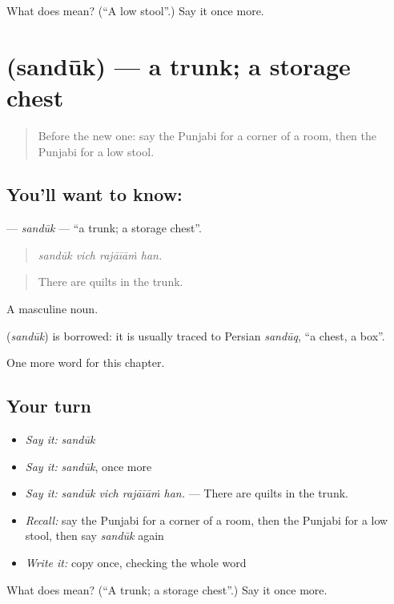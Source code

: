 \begin{tcolorbox}[breakable,colback=teal!4,colframe=teal!35!black,title={Before you move on}]
What does  mean? (\textquotedblleft{}A low stool\textquotedblright{}.) Say it once more.
\end{tcolorbox}
\section[\texorpdfstring{\pa{ਸੰਦੂਕ} (sandūk)}{ਸੰਦੂਕ (sandūk)}]{ (sandūk) — a trunk; a storage chest}

\label{lesson:PA-C247-sanduk}



\begin{quote}
Before the new one: say the Punjabi for a corner of a room, then the Punjabi for a low stool.
\end{quote}

\subsection*{You'll want to know: }
\textbf{} — \emph{sandūk} — \textquotedblleft{}a trunk; a storage chest\textquotedblright{}.

\begin{quote}
   
\end{quote}

\begin{quote}
\emph{sandūk vich rajāīāṁ han.}
\end{quote}

\begin{quote}
There are quilts in the trunk.
\end{quote}

A masculine noun.

\begin{cousinweb}
\textbf{} (\emph{sandūk}) is borrowed: it is usually traced to Persian \emph{sandūq}, \textquotedblleft{}a chest, a box\textquotedblright{}.
\end{cousinweb}

\begin{grammarlens}[title={What you've built}]
One more word for this chapter.
\end{grammarlens}

\subsection*{Your turn}
\begin{itemize}
\raggedright
  \item \emph{Say it:} \emph{sandūk}
  \item \emph{Say it:} \emph{sandūk}, once more
  \item \emph{Say it:} \emph{sandūk vich rajāīāṁ han.} — There are quilts in the trunk.
  \item \emph{Recall:} say the Punjabi for a corner of a room, then the Punjabi for a low stool, then say \emph{sandūk} again
  \item \emph{Write it:} copy \textbf{} once, checking the whole word
\end{itemize}

\begin{tcolorbox}[breakable,colback=teal!4,colframe=teal!35!black,title={Before you move on}]
What does  mean? (\textquotedblleft{}A trunk; a storage chest\textquotedblright{}.) Say it once more.
\end{tcolorbox}
